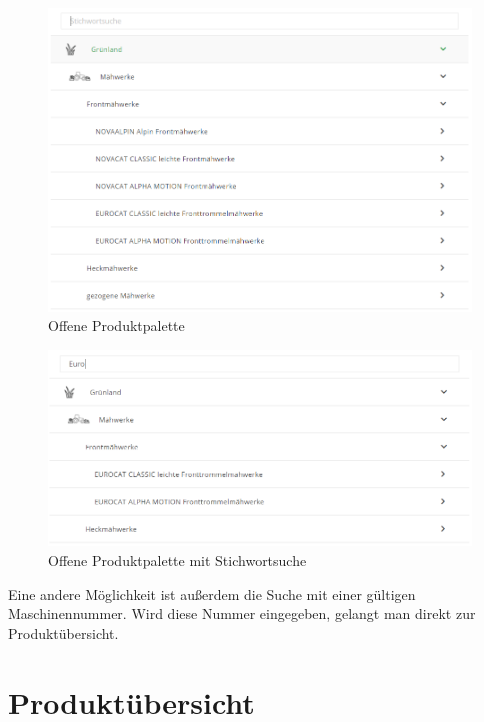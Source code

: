 \begin{figure}[H]
	\centerline{
		\includegraphics[width=1\textwidth, frame]{./grafiken/erm_produktpalette_offen.png}
	}
	\vskip0pt
	\caption{Offene Produktpalette} \label{fig:produktpaletteOffen}
\end{figure}

\begin{figure}[H]
	\centerline{
		\includegraphics[width=1\textwidth, frame]{./grafiken/erm_produktpalette_offen_stichwort.PNG}
	}
	\vskip0pt
	\caption{Offene Produktpalette mit Stichwortsuche} \label{fig:produktpaletteMitStichwort}
\end{figure}

Eine andere Möglichkeit ist außerdem die Suche mit einer gültigen Maschinennummer. Wird diese Nummer eingegeben, gelangt man direkt zur Produktübersicht.

\section{Produktübersicht}

